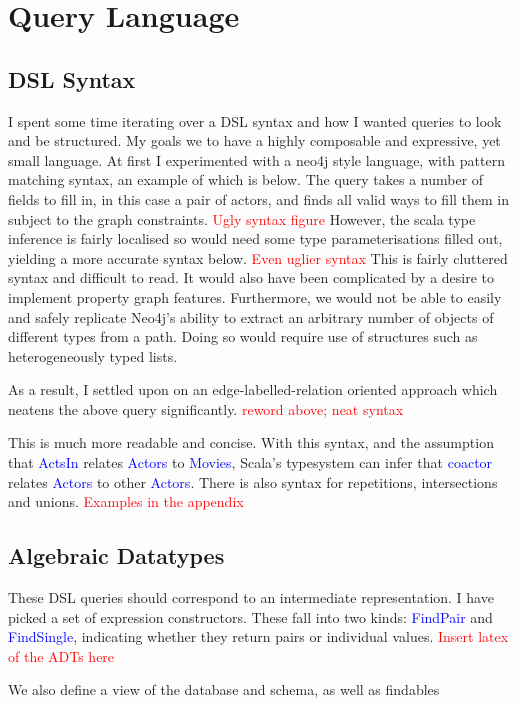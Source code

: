 \documentclass[12pt,a4paper,twoside,openright]{report}
\newcommand\todo[1]{\textcolor{red}{#1}}
\newcommand\codeName[1]{\textcolor{blue}{#1}}
\begin{document}
\section{Query Language}
\subsection{DSL Syntax}
I spent some time iterating over a DSL syntax and how I wanted queries to look and be structured. My goals we to have a highly composable and expressive, yet small language. At first I experimented with a neo4j style language, with pattern matching syntax, an example of which is below. The query takes a number of fields to fill in, in this case a pair of actors, and finds all valid ways to fill them in subject to the graph constraints.
\todo{Ugly syntax figure}
However, the scala type inference is fairly localised so would need some type parameterisations filled out, yielding a more accurate syntax below.
\todo{Even uglier syntax}
This is fairly cluttered syntax and difficult to read. It would also have been complicated by a desire to implement property graph features. Furthermore, we would not be able to easily and safely replicate Neo4j’s ability to extract an arbitrary number of objects of different types from a path. Doing so would require use of structures such as heterogeneously typed lists.

As a result, I settled upon on an edge-labelled-relation oriented approach which neatens the above query significantly.
\todo{reword above;}
\todo{neat syntax}

This is much more readable and concise. With this syntax, and the assumption that \codeName{ActsIn} relates \codeName{Actors} to \codeName{Movies}, Scala’s typesystem can infer that \codeName{coactor} relates \codeName{Actors} to other \codeName{Actors}. There is also syntax for repetitions, intersections and unions. \todo{Examples in the appendix}
\subsection{Algebraic Datatypes}
These DSL queries should correspond to an intermediate representation. I have picked a set of expression constructors. These fall into two kinds: \codeName{FindPair} and \codeName{FindSingle}, indicating whether they return pairs or individual values. \todo{Insert latex of the ADTs here}

We also define a view of the database and schema, as well as findables 
\end{document}
